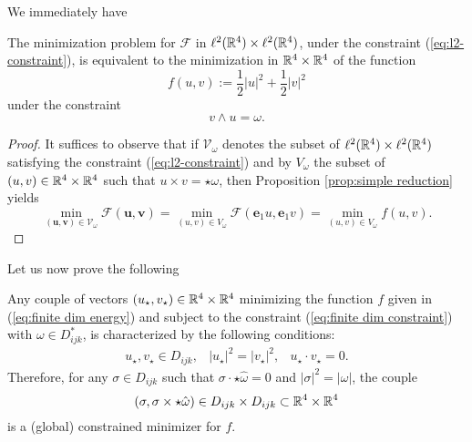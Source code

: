 We immediately have

\begin{corollary}
\label{cor:simple reduction}
The minimization problem for $\mathcal{F}$ in $\ell^2(\mathbb{R}^4) \times \ell^2(\mathbb{R}^4)$, under the constraint (\ref{eq:l2-constraint}), is equivalent to the minimization in $\mathbb{R}^4 \times \mathbb{R}^4$ of the function
\begin{equation}
\label{eq:finite dim energy}
 	f(u,v) := \frac{1}{2}|u|^2 + \frac{1}{2} |v|^2
 \end{equation} 
 under the constraint
 \begin{equation}
 \label{eq:finite dim constraint}
 v \wedge u = \omega.
 \end{equation}
\end{corollary}

\begin{proof}
It suffices to observe that if $\mathcal{V}_{\omega}$ denotes the subset of $\ell^2(\mathbb{R}^4) \times \ell^2(\mathbb{R}^4)$ satisfying the constraint (\ref{eq:l2-constraint}) and by $V_{\omega}$ the subset of $(u, v)  \in \mathbb{R}^4 \times \mathbb{R}^4$ such that $u \times v = \star\omega$, then Proposition \ref{prop:simple reduction} yields
\begin{equation}
\min_{(\mathbf{u}, \mathbf{v}) \in \mathcal{V}_{\omega}}\mathcal{F}(\mathbf{u}, \mathbf{v}) = \min_{(u, v) \in V_\omega} \mathcal{F}(\mathbf{e}_1 u, \mathbf{e}_1 v) = \min_{(u,v) \in V_{\omega}} f(u,v).
\end{equation}
\end{proof}

Let us now prove the following


\begin{proposition}
\label{prop:finite dim minimization}
Any couple of vectors $(u_{\star}, v_{\star}) \in \mathbb{R}^4 \times \mathbb{R}^4$ minimizing the function $f$ given in (\ref{eq:finite dim energy}) and subject to the constraint (\ref{eq:finite dim constraint}) with $\omega \in D_{ijk}^{*}$, is characterized by the following conditions:
\begin{eqnarray}
\label{eq:finite dim minimization conditions}
u_{\star}, v_{\star} \in D_{ijk}, & 
|u_{\star}|^2 = |v_{\star}|^2, & 
u_{\star} \cdot v_{\star} = 0.
\end{eqnarray}
Therefore, for any $\sigma \in D_{ijk}$ such that $\sigma \cdot \star\hat{\omega} = 0$ and $|\sigma|^2 = |\omega|$, the couple
\begin{equation}
(\sigma, \sigma \times \star \hat{\omega}) \in D_{ijk} \times D_{ijk} \subset \mathbb{R}^4 \times \mathbb{R}^4
\end{equation}
is a (global) constrained minimizer for $f$.
\end{proposition}

